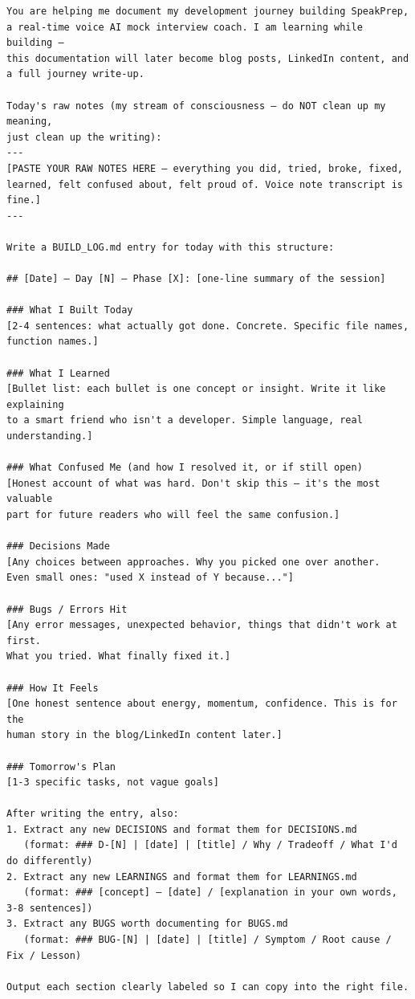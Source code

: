 \documentclass[
  11pt,
]{article}
\begin{document}
\begin{lstlisting}
You are helping me document my development journey building SpeakPrep,
a real-time voice AI mock interview coach. I am learning while building —
this documentation will later become blog posts, LinkedIn content, and
a full journey write-up.

Today's raw notes (my stream of consciousness — do NOT clean up my meaning,
just clean up the writing):
---
[PASTE YOUR RAW NOTES HERE — everything you did, tried, broke, fixed,
learned, felt confused about, felt proud of. Voice note transcript is fine.]
---

Write a BUILD_LOG.md entry for today with this structure:

## [Date] — Day [N] — Phase [X]: [one-line summary of the session]

### What I Built Today
[2-4 sentences: what actually got done. Concrete. Specific file names, function names.]

### What I Learned
[Bullet list: each bullet is one concept or insight. Write it like explaining
to a smart friend who isn't a developer. Simple language, real understanding.]

### What Confused Me (and how I resolved it, or if still open)
[Honest account of what was hard. Don't skip this — it's the most valuable
part for future readers who will feel the same confusion.]

### Decisions Made
[Any choices between approaches. Why you picked one over another.
Even small ones: "used X instead of Y because..."]

### Bugs / Errors Hit
[Any error messages, unexpected behavior, things that didn't work at first.
What you tried. What finally fixed it.]

### How It Feels
[One honest sentence about energy, momentum, confidence. This is for the
human story in the blog/LinkedIn content later.]

### Tomorrow's Plan
[1-3 specific tasks, not vague goals]

After writing the entry, also:
1. Extract any new DECISIONS and format them for DECISIONS.md
   (format: ### D-[N] | [date] | [title] / Why / Tradeoff / What I'd do differently)
2. Extract any new LEARNINGS and format them for LEARNINGS.md
   (format: ### [concept] — [date] / [explanation in your own words, 3-8 sentences])
3. Extract any BUGS worth documenting for BUGS.md
   (format: ### BUG-[N] | [date] | [title] / Symptom / Root cause / Fix / Lesson)

Output each section clearly labeled so I can copy into the right file.
\end{lstlisting}
\end{document}
